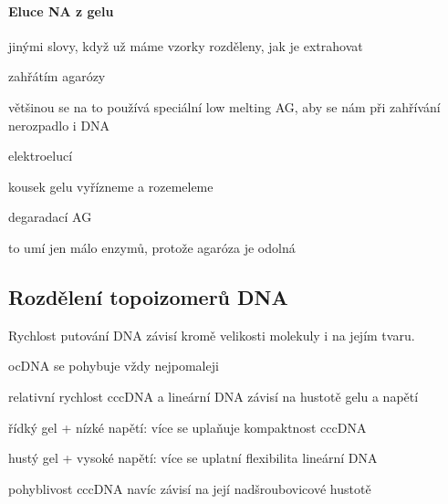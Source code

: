 \documentclass[DIV=8]{scrreprt}
\begin{document}
\paragraph{Eluce NA z gelu}
\begin{myItemize}[nosep]
    \item jinými slovy, když už máme vzorky rozděleny, jak je extrahovat
    \item zahřátím agarózy
\begin{myItemize}[nosep]
    \item většinou se na to používá speciální low melting AG, aby se nám při zahřívání nerozpadlo i DNA
\end{myItemize}

    \item elektroelucí
\begin{myItemize}[nosep]
    \item kousek gelu vyřízneme a rozemeleme
\end{myItemize}

    \item degaradací AG
\begin{myItemize}[nosep]
    \item to umí jen málo enzymů, protože agaróza je odolná
\end{myItemize}

\end{myItemize}



\subsection{Rozdělení topoizomerů DNA} \label{Rozdělení topoizomerů DNA}


Rychlost putování DNA závisí kromě velikosti molekuly i na jejím tvaru.

\begin{myItemize}[nosep]
    \item ocDNA se pohybuje vždy nejpomaleji
    \item relativní rychlost cccDNA a lineární DNA závisí na hustotě gelu a napětí
\begin{myItemize}[nosep]
    \item řídký gel + nízké napětí: více se uplaňuje kompaktnost cccDNA
    \item hustý gel + vysoké napětí: více se uplatní flexibilita lineární DNA
    \item pohyblivost cccDNA navíc závisí na její nadšroubovicové hustotě
\end{myItemize}

\end{myItemize}
\end{document}
